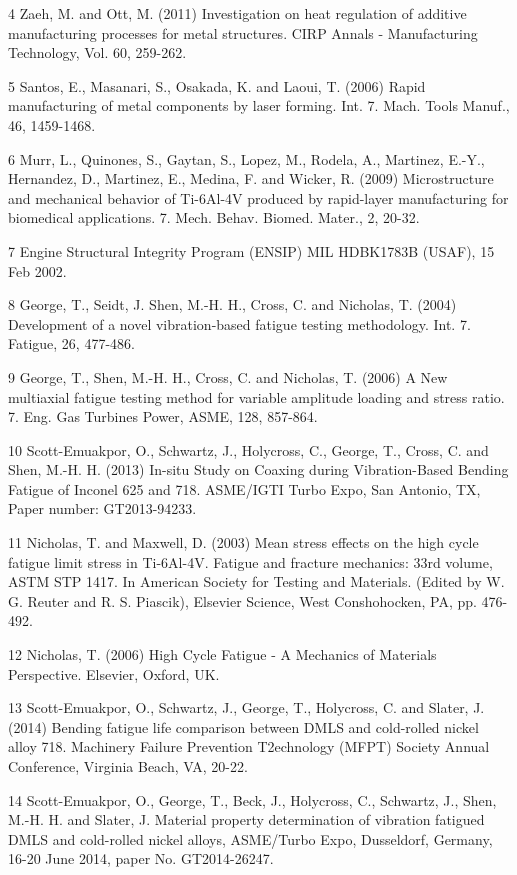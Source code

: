 \documentclass[10pt]{article}
\begin{document}
4 Zaeh, M. and Ott, M. (2011) Investigation on heat regulation of additive manufacturing processes for metal structures. CIRP Annals - Manufacturing Technology, Vol. 60, 259-262.

5 Santos, E., Masanari, S., Osakada, K. and Laoui, T. (2006) Rapid manufacturing of metal components by laser forming. Int. 7. Mach. Tools Manuf., 46, 1459-1468.

6 Murr, L., Quinones, S., Gaytan, S., Lopez, M., Rodela, A., Martinez, E.-Y., Hernandez, D., Martinez, E., Medina, F. and Wicker, R. (2009) Microstructure and mechanical behavior of Ti-6Al-4V produced by rapid-layer manufacturing for biomedical applications. 7. Mech. Behav. Biomed. Mater., 2, 20-32.

7 Engine Structural Integrity Program (ENSIP) MIL HDBK1783B (USAF), 15 Feb 2002.

8 George, T., Seidt, J. Shen, M.-H. H., Cross, C. and Nicholas, T. (2004) Development of a novel vibration-based fatigue testing methodology. Int. 7. Fatigue, 26, 477-486.

9 George, T., Shen, M.-H. H., Cross, C. and Nicholas, T. (2006) A New multiaxial fatigue testing method for variable amplitude loading and stress ratio. 7. Eng. Gas Turbines Power, ASME, 128, 857-864.

10 Scott-Emuakpor, O., Schwartz, J., Holycross, C., George, T., Cross, C. and Shen, M.-H. H. (2013) In-situ Study on Coaxing during Vibration-Based Bending Fatigue of Inconel 625 and 718. ASME/IGTI Turbo Expo, San Antonio, TX, Paper number: GT2013-94233.

11 Nicholas, T. and Maxwell, D. (2003) Mean stress effects on the high cycle fatigue limit stress in Ti-6Al-4V. Fatigue and fracture mechanics: 33rd volume, ASTM STP 1417. In American Society for Testing and Materials. (Edited by W. G. Reuter and R. S. Piascik), Elsevier Science, West Conshohocken, PA, pp. 476-492.

12 Nicholas, T. (2006) High Cycle Fatigue - A Mechanics of Materials Perspective. Elsevier, Oxford, UK.

13 Scott-Emuakpor, O., Schwartz, J., George, T., Holycross, C. and Slater, J. (2014) Bending fatigue life comparison between DMLS and cold-rolled nickel alloy 718. Machinery Failure Prevention T2echnology (MFPT) Society Annual Conference, Virginia Beach, VA, 20-22.

14 Scott-Emuakpor, O., George, T., Beck, J., Holycross, C., Schwartz, J., Shen, M.-H. H. and Slater, J. Material property determination of vibration fatigued DMLS and cold-rolled nickel alloys, ASME/Turbo Expo, Dusseldorf, Germany, 16-20 June 2014, paper No. GT2014-26247.
\end{document}
